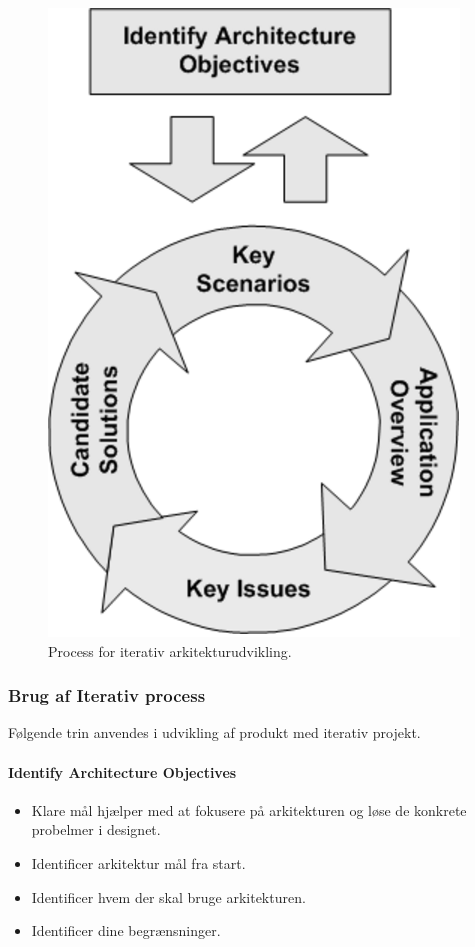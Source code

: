 \begin{figure}[h]
	\centering
	\includegraphics[width=0.35\linewidth]{figs/arc_ite}
	\caption{Process for iterativ arkitekturudvikling.}
	\label{fig:arc_ite}
\end{figure}

\subsubsection{Brug af Iterativ process}\label{sec:arc_ite}
Følgende trin anvendes i udvikling af produkt med iterativ projekt.

\paragraph{Identify Architecture Objectives}
\begin{itemize}
	\item Klare mål hjælper med at fokusere på arkitekturen og løse de konkrete probelmer i designet.
	\item Identificer arkitektur mål fra start.
	\item Identificer hvem der skal bruge arkitekturen.
	\item Identificer dine begrænsninger.
\end{itemize}

